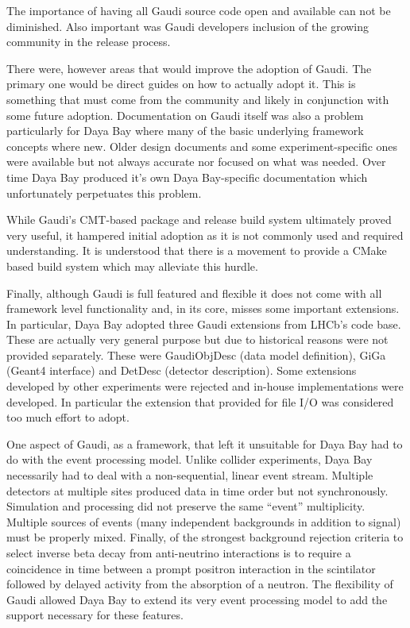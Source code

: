 The importance of having all Gaudi source code open and available can
not be diminished.  Also important was Gaudi developers inclusion of
the growing community in the release process.

There were, however areas that would improve the adoption of Gaudi.
The primary one would be direct guides on how to actually adopt it.
This is something that must come from the community and likely in
conjunction with some future adoption.  Documentation on Gaudi itself
was also a problem particularly for Daya Bay where many of the basic
underlying framework concepts where new.  Older design documents and
some experiment-specific ones were available but not always accurate
nor focused on what was needed.  Over time Daya Bay produced it's own
Daya Bay-specific documentation which unfortunately perpetuates this
problem.

While Gaudi's CMT-based package and release build system ultimately
proved very useful, it hampered initial adoption as it is not commonly
used and required understanding.  It is understood that there is a
movement to provide a CMake based build system which may alleviate
this hurdle.

Finally, although Gaudi is full featured and flexible it does not come
with all framework level functionality and, in its core, misses some
important extensions.  In particular, Daya Bay adopted three Gaudi
extensions from LHCb's code base.  These are actually very general
purpose but due to historical reasons were not provided separately.
These were GaudiObjDesc (data model definition), GiGa (Geant4
interface) and DetDesc (detector description).  Some extensions
developed by other experiments were rejected and in-house
implementations were developed.  In particular the extension that
provided for file I/O was considered too much effort to adopt.   

One aspect of Gaudi, as a framework, that left it unsuitable for Daya
Bay had to do with the event processing model.  Unlike collider
experiments, Daya Bay necessarily had to deal with a non-sequential,
linear event stream.  Multiple detectors at multiple sites produced
data in time order but not synchronously.  Simulation and processing
did not preserve the same ``event'' multiplicity.  Multiple sources of
events (many independent backgrounds in addition to signal) must be
properly mixed.  Finally, of the strongest background rejection
criteria to select inverse beta decay from anti-neutrino interactions
is to require a coincidence in time between a prompt positron
interaction in the scintilator followed by delayed activity from the
absorption of a neutron.  The flexibility of Gaudi allowed Daya Bay to
extend its very event processing model to add the support necessary
for these features.  

